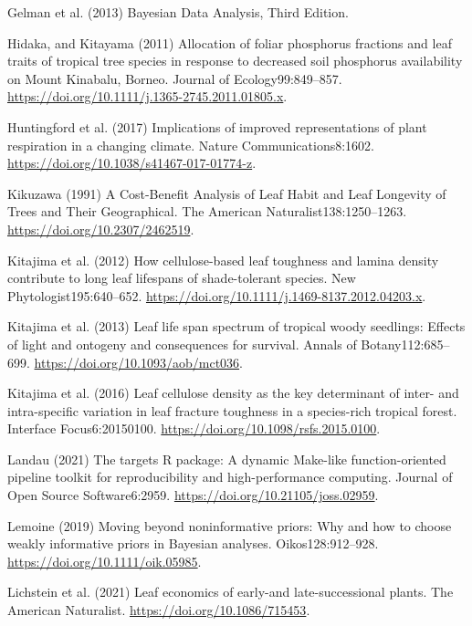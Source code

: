 \documentclass[
  12pt,
  letterpaper,
  DIV=11,
  numbers=noendperiod]{scrartcl}
\newlength{\cslhangindent}
\newenvironment{CSLReferences}[2] %
 {\begin{list}{}{%
  \setlength{\itemindent}{0pt}
  \setlength{\leftmargin}{0pt}
  \setlength{\parsep}{0pt}
  \ifodd #1
   \setlength{\leftmargin}{\cslhangindent}
   \setlength{\itemindent}{-1\cslhangindent}
  \fi
  \setlength{\itemsep}{#2\baselineskip}}}
 {\end{list}}
\begin{document}
\begin{CSLReferences}{1}{1}
Gelman et al. (2013) Bayesian {Data Analysis}, {Third Edition}.

Hidaka, and Kitayama (2011) Allocation of foliar phosphorus fractions
and leaf traits of tropical tree species in response to decreased soil
phosphorus availability on {Mount Kinabalu}, {Borneo}. Journal of
Ecology99:849--857.
\url{https://doi.org/10.1111/j.1365-2745.2011.01805.x}.

Huntingford et al. (2017) Implications of improved representations of
plant respiration in a changing climate. Nature Communications8:1602.
\url{https://doi.org/10.1038/s41467-017-01774-z}.

Kikuzawa (1991) A {Cost-Benefit Analysis} of {Leaf Habit} and {Leaf
Longevity} of {Trees} and {Their Geographical}. The American
Naturalist138:1250--1263. \url{https://doi.org/10.2307/2462519}.

Kitajima et al. (2012) How cellulose-based leaf toughness and lamina
density contribute to long leaf lifespans of shade-tolerant species. New
Phytologist195:640--652.
\url{https://doi.org/10.1111/j.1469-8137.2012.04203.x}.

Kitajima et al. (2013) Leaf life span spectrum of tropical woody
seedlings: {Effects} of light and ontogeny and consequences for
survival. Annals of Botany112:685--699.
\url{https://doi.org/10.1093/aob/mct036}.

Kitajima et al. (2016) Leaf cellulose density as the key determinant of
inter- and intra-specific variation in leaf fracture toughness in a
species-rich tropical forest. Interface Focus6:20150100.
\url{https://doi.org/10.1098/rsfs.2015.0100}.

Landau (2021) The targets {R} package: A dynamic {Make-like}
function-oriented pipeline toolkit for reproducibility and
high-performance computing. Journal of Open Source Software6:2959.
\url{https://doi.org/10.21105/joss.02959}.

Lemoine (2019) Moving beyond noninformative priors: Why and how to
choose weakly informative priors in {Bayesian} analyses.
Oikos128:912--928. \url{https://doi.org/10.1111/oik.05985}.

Lichstein et al. (2021) Leaf economics of early-and late-successional
plants. The American Naturalist. \url{https://doi.org/10.1086/715453}.


\end{CSLReferences}
\end{document}

